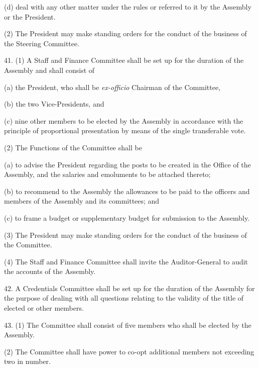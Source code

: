 (d) deal with any other matter under the rules or referred to it by the Assembly or the President.



(2) The President may make standing orders for the conduct of the business of the Steering Committee.



41. (1) A Staff and Finance Committee shall be set up for the duration of the Assembly and shall consist of\textemdash{}



(a) the President, who shall be \emph{ex-officio }Chairman of the Committee,

(b) the two Vice-Presidents, and

(c) nine other members to be elected by the Assembly in accordance with the principle of proportional presentation by means of the single transferable vote.



(2) The Functions of the Committee shall be\textemdash{}



(a) to advise the President regarding the posts to be created in the Office of the Assembly, and the salaries and emoluments to be attached thereto;

(b) to recommend to the Assembly the allowances to be paid to the officers and members of the Assembly and its committees; and

(c) to frame a budget or supplementary budget for submission to the Assembly.



(3) The President may make standing orders for the conduct of the business of the Committee.



(4) The Staff and Finance Committee shall invite the Auditor-General to audit the accounts of the Assembly.



42. A Credentials Committee shall be set up for the duration of the Assembly for the purpose of dealing with all questions relating to the validity of the title of elected or other members.



43. (1) The Committee shall consist of five members who shall be elected by the Assembly.



(2) The Committee shall have power to co-opt additional members not exceeding two in number.



